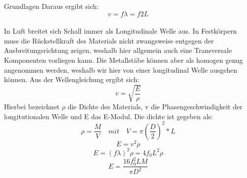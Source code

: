 \documentclass[twoside]{protokoll}
\begin{document}
\begin{aufgabe}{Grundlagen}
    Daraus ergibt sich: \\
    
    \begin{equation}
        v = f \lambda = f 2 L
    \end{equation}\\

    In Luft breitet sich Schall immer als Longitudinale Welle aus.
    In Festkörpern muss die Rückstellkraft des Materials nicht zwangsweise entgegen der Ausbreitungsrichtung zeigen, weshalb hier allgemein auch eine Transversale Komponenten vorliegen kann.
    Die Metallstäbe können aber als homogen genug angenommen werden, weshalb wir hier von einer longitudinal Welle ausgehen können.
    Aus der Wellengleichung ergibt sich:
    \begin{equation}
         v = \sqrt{\frac{E}{\rho}}
    \end{equation}
Hierbei bezeichnet $\rho$ die Dichte des Materials, v die Phasengeschwindigkeit der 
longitutionalen Welle und E das E-Modul. Die dichte ist gegeben als:
	\begin{equation}
	\rho = \frac{M}{V} \quad  mit \quad V = \pi\left(\frac{D}{2}\right)^2*L
	\end{equation}
    \begin{equation}
         E = v ^2 \rho
    \end{equation}
    \begin{equation}
        E = (f \lambda)^2 \rho = 4 f_0 L ^2 \rho
    \end{equation}
    \begin{equation}
        E = \frac{ 16 f_0^2 L M}{\pi D ^2}
    \end{equation}

     
\end{aufgabe}
\end{document}
